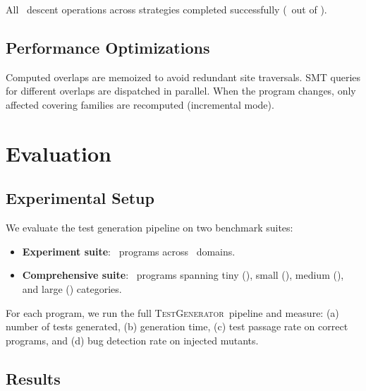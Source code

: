 \documentclass[11pt]{article}
\newcommand{\TestGen}{\textsc{TestGenerator}}
\begin{document}
All \subDescentOps\ descent operations across strategies completed
successfully (\subDescentOpsOk\ out of \subDescentOps).

\subsection{Performance Optimizations}
Computed overlaps are memoized to avoid redundant site traversals.  SMT
queries for different overlaps are dispatched in parallel.  When the program
changes, only affected covering families are recomputed (incremental mode).

\section{Evaluation}\label{sec:evaluation}

\subsection{Experimental Setup}
We evaluate the test generation pipeline on two benchmark suites:
\begin{itemize}[noitemsep]
  \item \textbf{Experiment suite}: \expTotalPrograms\ programs across
        \expDomainCount\ domains.
  \item \textbf{Comprehensive suite}: \compTotalPrograms\ programs spanning
        tiny (\compTinyCount), small (\compSmallCount), medium
        (\compMediumCount), and large (\compLargeCount) categories.
\end{itemize}

For each program, we run the full \TestGen\ pipeline and measure: (a) number
of tests generated, (b) generation time, (c) test passage rate on correct
programs, and (d) bug detection rate on injected mutants.

\subsection{Results}
\end{document}
